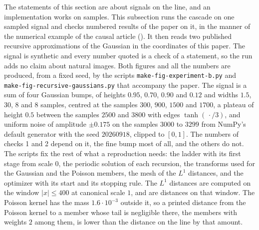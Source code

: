 The statements of this section are about signals on the line, and an implementation works on
samples. This subsection runs the cascade on one sampled signal and checks numbered results
of the paper on it, in the manner of the numerical example of the causal article
(). It then reads two published recursive approximations of
the Gaussian in the coordinates of this paper. The signal is synthetic and every number
quoted is a check of a statement, so the run adds no claim about natural images. Both figures
and all the numbers are produced, from a fixed seed, by the scripts \texttt{make-fig-experiment-b.py} and
\texttt{make-fig-recursive-gaussians.py} that accompany the paper. The signal is a sum of four
Gaussian bumps, of heights $0.95$, $0.70$, $0.90$ and $0.12$ and widths $1.5$, $30$, $8$ and $8$
samples, centred at the samples $300$, $900$, $1500$ and $1700$, a plateau of height $0.5$
between the samples $2500$ and $3800$ with edges $\tanh(\,\cdot/3)$, and uniform noise of
amplitude $\pm 0.175$ on the samples $3000$ to $3299$ from NumPy's default generator with the
seed $20260918$, clipped to $[0,1]$. The numbers of checks 1 and 2 depend on it, the fine bump
most of all, and the others do not. The scripts fix the rest of what a reproduction needs:
the ladder with its first stage from scale $0$, the periodic solution of each recursion, the
transforms used for the Gaussian and the Poisson members, the mesh of the $L^1$ distances, and
the optimizer with its start and its stopping rule. The $L^1$ distances are computed on the
window $|x| \le 400$ at canonical scale $1$, and are distances on that window. The Poisson
kernel has the mass $1.6\cdot10^{-3}$ outside it, so a printed distance from the Poisson kernel
to a member whose tail is negligible there, the members with weights $2$ among them, is lower
than the distance on the line by that amount.

